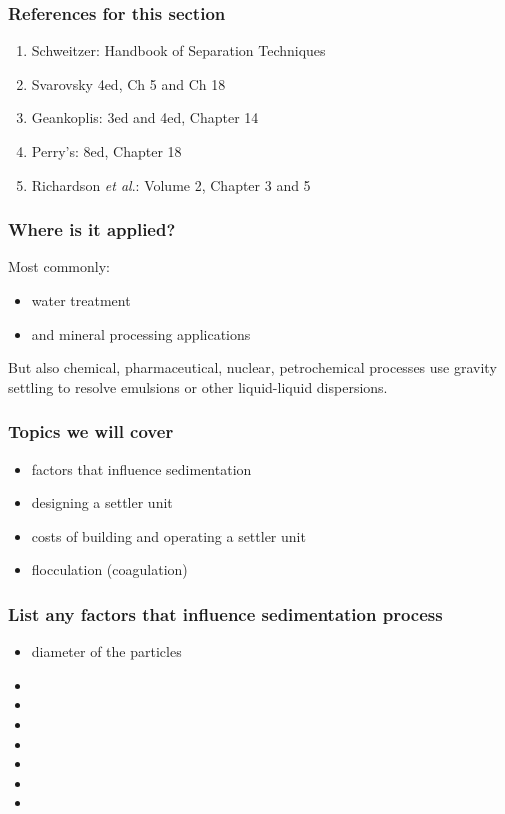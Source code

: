 \begin{frame}\frametitle{References for this section}
	\begin{enumerate}
		\item	Schweitzer: Handbook of Separation Techniques
		\item	Svarovsky 4ed, Ch 5 and Ch 18
		\item	Geankoplis: 3ed and 4ed, Chapter 14
		\item	Perry's: 8ed, Chapter 18
		\item	Richardson \emph{et al}.: Volume 2, Chapter 3 and 5		
	\end{enumerate}
\end{frame}

\begin{frame}\frametitle{Where is it applied?}	
	Most commonly:
	\begin{itemize}
		\item	water treatment
		\item	and mineral processing applications
	\end{itemize}
	
	\vspace{12pt}
	But also chemical, pharmaceutical, nuclear, petrochemical processes use gravity settling to resolve emulsions or other liquid-liquid dispersions. 	
\end{frame}

\begin{frame}\frametitle{Topics we will cover}
	\begin{itemize}
		\item	factors that influence sedimentation
		\item	designing a settler unit
		\item	costs of building and operating a settler unit
		\item	flocculation (coagulation)
	\end{itemize}
\end{frame}

\begin{frame}\frametitle{List any factors that influence sedimentation process}
	\begin{itemize}
		\item	diameter of the particles
		\pause
		\item	\iftoggle{instructor}{strength of gravitational field}{}
		\item	\iftoggle{instructor}{relative density of particle vs fluid}{}
		\item	\iftoggle{instructor}{density of fluid}{}
		\item	\iftoggle{instructor}{viscosity of fluid}{}
		\item	\iftoggle{instructor}{particle concentration (hindered)}{}
		\item	\iftoggle{instructor}{{\color{myRed}{no effect}}: diameter of the vessel}{}
		\item	\iftoggle{instructor}{{\color{myRed}{no effect}}: mass of particle}{}
	\end{itemize}
\end{frame}

